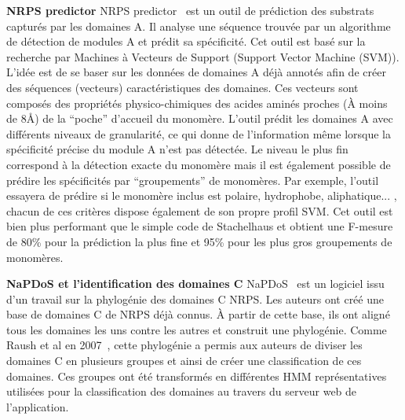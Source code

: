 \textbf{NRPS predictor}
NRPS predictor~\cite{rottig_nrpspredictor2web_2011,rausch_specificity_2005} est un outil de prédiction des substrats capturés par les domaines A.
Il analyse une séquence trouvée par un algorithme de détection de modules A et prédit sa spécificité.
Cet outil est basé sur la recherche par Machines à Vecteurs de Support (Support Vector Machine (SVM)).
L'idée est de se baser sur les données de domaines A déjà annotés afin de créer des séquences (vecteurs) caractéristiques des domaines.
Ces vecteurs sont composés des propriétés physico-chimiques des acides aminés proches (À moins de 8Å) de la ``poche'' d'accueil du monomère.
L'outil prédit les domaines A avec différents niveaux de granularité, ce qui donne de l'information même lorsque la spécificité précise du module A n'est pas détectée.
Le niveau le plus fin correspond à la détection exacte du monomère mais il est également possible de prédire les spécificités par ``groupements'' de monomères.
Par exemple, l'outil essayera de prédire si le monomère inclus est polaire, hydrophobe, aliphatique... , chacun de ces critères dispose également de son propre profil SVM.
Cet outil est bien plus performant que le simple code de Stachelhaus et obtient une F-mesure de 80\% pour la prédiction la plus fine et 95\% pour les plus gros groupements de monomères.


\textbf{NaPDoS et l'identification des domaines C}
NaPDoS~\cite{ziemert_natural_2012} est un logiciel issu d'un travail sur la phylogénie des domaines C NRPS.
Les auteurs ont créé une base de domaines C de NRPS déjà connus.
À partir de cette base, ils ont aligné tous les domaines les uns contre les autres et construit une phylogénie.
Comme Raush et al en 2007~\cite{rausch_phylogenetic_2007}, cette phylogénie a permis aux auteurs de diviser les domaines C en plusieurs groupes et ainsi de créer une classification de ces domaines.
Ces groupes ont été transformés en différentes HMM représentatives utilisées pour la classification des domaines au travers du serveur web de l'application.


